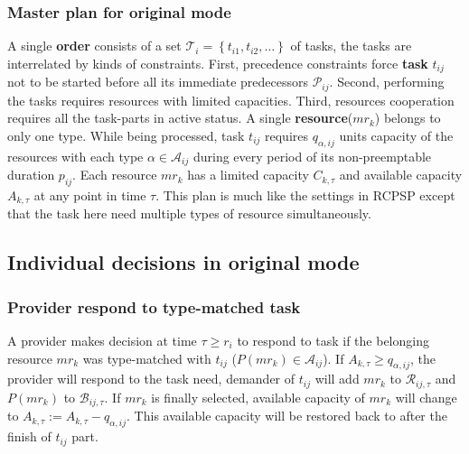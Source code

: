 \subsubsection{Master plan for original mode} %
\label{ssub:master_plam}
A single \textbf{order} consists of a set $\mathcal{T}_i = \left\{ t_{i1},t_{i2},\dots\right\}$ of tasks, the tasks are interrelated by kinds of constraints. First, precedence constraints force \textbf{task} $t_{ij}$ not to be started before all its immediate predecessors $\mathcal{P}_{ij}$. Second, performing the tasks requires resources with limited capacities. Third, resources cooperation requires all the task-parts in active status.
A single \textbf{resource}($mr_k$) belongs to only one type. While being processed, task $t_{ij}$ requires $q_{\alpha,ij}$ units capacity of the resources with each type $\alpha\in\mathcal{A}_{ij}$ during every period of its non-preemptable duration $p_{ij}$. Each resource $mr_k$ has a limited capacity $C_{k,\tau}$ and available capacity $A_{k,\tau}$ at any point in time $\tau$. This plan is much like the settings in RCPSP\cite{Kolisch1999} except that the task here need multiple types of resource simultaneously.

\subsection{Individual decisions in original mode} %
\label{sub:interactions_and_decisions}
\subsubsection{Provider respond to type-matched task}
\label{subs:Response_for_type_matched_task}
A provider makes decision at time $\tau\ge r_i$ to respond  to task if the belonging resource $mr_k$ was type-matched with $t_{ij}$ ($P(mr_k)\in\mathcal{A}_{ij}$). If $A_{k,\tau} \ge q_{\alpha,ij}$, the provider will respond to the task need, demander of $t_{ij}$ will add $mr_k$ to $\mathcal{R}_{ij,\tau}$ and $P(mr_k)$ to $\mathcal{B}_{ij,\tau}$. If $mr_k$ is finally selected, available capacity of $mr_k$ will change to $A_{k,\tau} := A_{k,\tau} - q_{\alpha,ij}$. This available capacity will be restored back to after the finish of $t_{ij}$ part.

